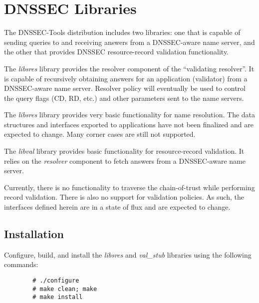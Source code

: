 \documentclass[12pt]{article}
\newcommand{\cmd}[1]{{\em #1}}
\newcommand{\lib}[1]{{\em #1}}
\begin{document}

\clearpage

\section{DNSSEC Libraries}
\label{libraries}

The DNSSEC-Tools distribution includes two libraries:  one that is capable of
sending queries to and receiving answers from a DNSSEC-aware name server,
and the other that provides DNSSEC resource-record validation functionality.

The \lib{libsres} library provides the resolver component of the ``validating
resolver''.  It is capable of recursively obtaining answers for an application
(validator) from a DNSSEC-aware name server.  Resolver policy will eventually
be used to control the query flags (CD, RD, etc.) and other parameters
sent to the name servers.

The \lib{libsres} library provides very basic functionality for name
resolution.  The data structures and interfaces exported to applications
have not been finalized and are expected to change. Many corner cases are
still not supported.

The \lib{libval} library provides basic functionality for resource-record
validation.  It relies on the \cmd{resolver} component to fetch answers
from a DNSSEC-aware name server.

Currently, there is no functionality to traverse the chain-of-trust while
performing record validation.  There is also no support for validation
policies. As such, the interfaces defined herein are in a state of flux
and are expected to change.


\subsection{Installation}

Configure, build, and install the \lib{libsres} and \lib{val\_stub} libraries
using the following commands:

\begin{verbatim}
        # ./configure
        # make clean; make
        # make install
\end{verbatim}
\end{document}

